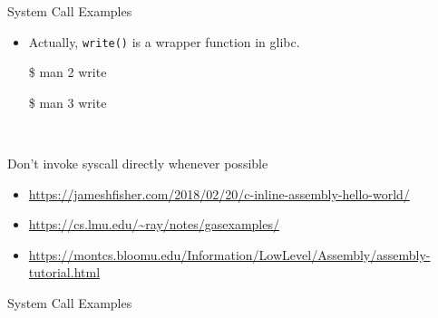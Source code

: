 \begin{frame}{System Call Examples}
  \begin{minipage}{.55\linewidth}
  \end{minipage}\quad
  \begin{minipage}{.4\linewidth}\ttfamily\footnotesize
    \begin{itemize}
    \item Actually, \texttt{write()} is a wrapper function in glibc.
    \item[\$] man 2 write
    \item[\$] man 3 write
    \end{itemize}
  \end{minipage}\\[1em]
  \begin{description}
  \item[Don't invoke syscall directly whenever possible]
  \end{description}
\end{frame}

\begin{itemize}
\item \url{https://jameshfisher.com/2018/02/20/c-inline-assembly-hello-world/}
\item \url{https://cs.lmu.edu/~ray/notes/gasexamples/}
\item \url{https://montcs.bloomu.edu/Information/LowLevel/Assembly/assembly-tutorial.html}
\end{itemize}

\begin{frame}{System Call Examples}
  \begin{center}
  \end{center}
\end{frame}

\begin{frame}
  \begin{center}
  \end{center}
\end{frame}

